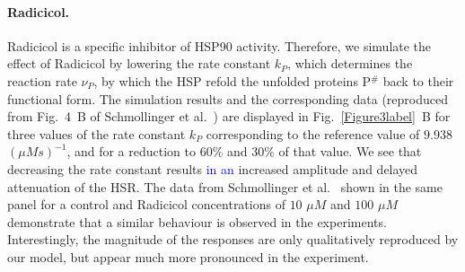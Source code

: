 \documentclass[oneside, 10pt, a4paper, twocolumn]{article}
\begin{document}
\paragraph{Radicicol.}

Radicicol is a specific inhibitor of HSP90 activity.
Therefore, we simulate the effect of Radicicol by lowering the rate constant $k_P$,
which determines the reaction rate $\nu_P$, by which the HSP refold the unfolded proteins P$^\#$ back to their functional form. 
The simulation results and the corresponding data (reproduced from Fig.~4~B of Schmollinger et al.~\cite{Schmollinger2013}) are
displayed in Fig.~\ref{Figure3label}~B for three values of the rate constant $k_P$ corresponding to the reference value of $9.938$ $\left(\mu M s\right)^{-1}$,
and for a reduction to $60\%$ and $30\%$ of that value. 
We see that decreasing the rate constant results \textcolor{blue}{in an} increased amplitude and delayed attenuation of the HSR.
The data from Schmollinger et al.~\cite{Schmollinger2013} shown in the same panel for a control and Radicicol concentrations of $10$ $\mu M$ and $100$ $\mu M$
demonstrate that a similar behaviour is observed in the experiments.
Interestingly, the magnitude of the responses are only qualitatively reproduced by our model, but
appear much more pronounced in the experiment. 

%
\end{document}
